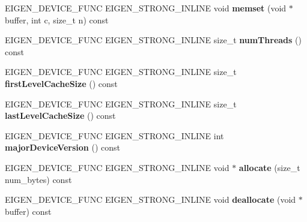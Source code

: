 \begin{DoxyCompactItemize}
\item 
\mbox{\label{struct_eigen_1_1_default_device_a2a16cec4646fdc58b2f92ed552fb391d}} 
E\+I\+G\+E\+N\+\_\+\+D\+E\+V\+I\+C\+E\+\_\+\+F\+U\+NC E\+I\+G\+E\+N\+\_\+\+S\+T\+R\+O\+N\+G\+\_\+\+I\+N\+L\+I\+NE void {\bfseries memset} (void $\ast$buffer, int c, size\+\_\+t n) const
\item 
\mbox{\label{struct_eigen_1_1_default_device_a7c73e4e69f8c0ad6505104f45832a0d6}} 
E\+I\+G\+E\+N\+\_\+\+D\+E\+V\+I\+C\+E\+\_\+\+F\+U\+NC E\+I\+G\+E\+N\+\_\+\+S\+T\+R\+O\+N\+G\+\_\+\+I\+N\+L\+I\+NE size\+\_\+t {\bfseries num\+Threads} () const
\item 
\mbox{\label{struct_eigen_1_1_default_device_a7433e4c7d515d523cd81e2e93402152c}} 
E\+I\+G\+E\+N\+\_\+\+D\+E\+V\+I\+C\+E\+\_\+\+F\+U\+NC E\+I\+G\+E\+N\+\_\+\+S\+T\+R\+O\+N\+G\+\_\+\+I\+N\+L\+I\+NE size\+\_\+t {\bfseries first\+Level\+Cache\+Size} () const
\item 
\mbox{\label{struct_eigen_1_1_default_device_aa34a7449cafbe5ea56dba58f0e594410}} 
E\+I\+G\+E\+N\+\_\+\+D\+E\+V\+I\+C\+E\+\_\+\+F\+U\+NC E\+I\+G\+E\+N\+\_\+\+S\+T\+R\+O\+N\+G\+\_\+\+I\+N\+L\+I\+NE size\+\_\+t {\bfseries last\+Level\+Cache\+Size} () const
\item 
\mbox{\label{struct_eigen_1_1_default_device_a7396ca9b92e286981441b14056cf06a2}} 
E\+I\+G\+E\+N\+\_\+\+D\+E\+V\+I\+C\+E\+\_\+\+F\+U\+NC E\+I\+G\+E\+N\+\_\+\+S\+T\+R\+O\+N\+G\+\_\+\+I\+N\+L\+I\+NE int {\bfseries major\+Device\+Version} () const
\item 
\mbox{\label{struct_eigen_1_1_default_device_a4e7a567011fa78c87f4c3737883af280}} 
E\+I\+G\+E\+N\+\_\+\+D\+E\+V\+I\+C\+E\+\_\+\+F\+U\+NC E\+I\+G\+E\+N\+\_\+\+S\+T\+R\+O\+N\+G\+\_\+\+I\+N\+L\+I\+NE void $\ast$ {\bfseries allocate} (size\+\_\+t num\+\_\+bytes) const
\item 
\mbox{\label{struct_eigen_1_1_default_device_a37161c54e19b871cdffadbbc0e4bea12}} 
E\+I\+G\+E\+N\+\_\+\+D\+E\+V\+I\+C\+E\+\_\+\+F\+U\+NC E\+I\+G\+E\+N\+\_\+\+S\+T\+R\+O\+N\+G\+\_\+\+I\+N\+L\+I\+NE void {\bfseries deallocate} (void $\ast$buffer) const

\end{DoxyCompactItemize}
